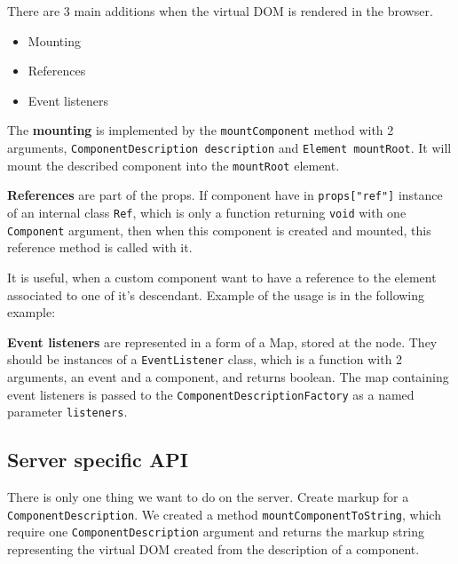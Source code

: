     There are 3 main additions when the virtual DOM is rendered in the browser.
    \begin{itemize}
      \item Mounting
      \item References
      \item Event listeners
    \end{itemize}

    The \textbf{mounting} is implemented by the \texttt{mountComponent} method with 2 arguments, 
    \texttt{ComponentDescription description} and \texttt{Element mountRoot}.
    It will mount the described component into the \texttt{mountRoot} element.
    

    \textbf{References} are part of the props. 
    If component have in \texttt{props["ref"]} instance of an internal class \texttt{{\textunderscore}Ref}, 
    which is only a function returning \texttt{void} with one \texttt{Component} argument, 
    then when this component is created and mounted, 
    this reference method is called with it. 

    It is useful, when a custom component want to have a reference to the element associated to one of it's descendant. 
    Example of the usage is in the following example:
    

    \textbf{Event listeners} are represented in a form of a Map, stored at the node. 
    They should be instances of a \texttt{EventListener} class, which is a function with 2 arguments, an event and a component, and returns boolean.
    The map containing event listeners is passed to the \texttt{ComponentDescriptionFactory} as a named parameter \texttt{listeners}.
    

  \subsection{Server specific API}\label{subsec:our-api-server}

    There is only one thing we want to do on the server. Create markup for a \texttt{ComponentDescription}.
    We created a method \texttt{mountComponentToString}, 
    which require one \texttt{ComponentDescription} argument and returns the markup string representing the virtual DOM created from the description of a component.
    
